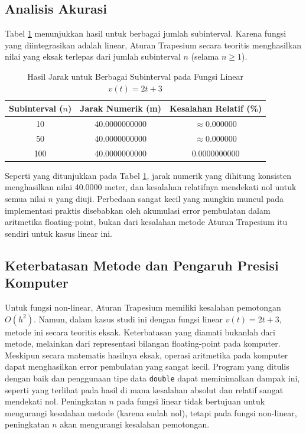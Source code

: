 \documentclass[conference]{IEEEtran}
\begin{document}
\subsection{Analisis Akurasi}
Tabel \ref{tab:results} menunjukkan hasil untuk berbagai jumlah subinterval. Karena fungsi yang diintegrasikan adalah linear, Aturan Trapesium secara teoritis menghasilkan nilai yang eksak terlepas dari jumlah subinterval \(n\) (selama \(n \ge 1\)).
\begin{table}[htbp]
\caption{Hasil Jarak untuk Berbagai Subinterval pada Fungsi Linear \(v(t)=2t+3\)}
\begin{center}
\small %
\begin{tabular}{|c|c|c|} %
\hline
\textbf{Subinterval (\( n \))} & \textbf{Jarak Numerik (m)} & \textbf{Kesalahan Relatif (\%)} \\
\hline
10 & 40.0000000000 & $\approx 0.000000$ \\ %
50 & 40.0000000000 & $\approx 0.000000$ \\ %
100 & 40.0000000000 & $0.0000000000$ \\ %
\hline
\end{tabular}
\label{tab:results}
\end{center}
\end{table}
Seperti yang ditunjukkan pada Tabel \ref{tab:results}, jarak numerik yang dihitung konsisten menghasilkan nilai 40.0000 meter, dan kesalahan relatifnya mendekati nol untuk semua nilai \( n \) yang diuji. Perbedaan sangat kecil yang mungkin muncul pada implementasi praktis disebabkan oleh akumulasi error pembulatan dalam aritmetika floating-point, bukan dari kesalahan metode Aturan Trapesium itu sendiri untuk kasus linear ini.

\subsection{Keterbatasan Metode dan Pengaruh Presisi Komputer}
Untuk fungsi non-linear, Aturan Trapesium memiliki kesalahan pemotongan \(O(h^2)\). Namun, dalam kasus studi ini dengan fungsi linear \(v(t) = 2t+3\), metode ini secara teoritis eksak. Keterbatasan yang diamati bukanlah dari metode, melainkan dari representasi bilangan floating-point pada komputer. Meskipun secara matematis hasilnya eksak, operasi aritmetika pada komputer dapat menghasilkan error pembulatan yang sangat kecil. Program yang ditulis dengan baik dan penggunaan tipe data \texttt{double} dapat meminimalkan dampak ini, seperti yang terlihat pada hasil di mana kesalahan absolut dan relatif sangat mendekati nol. Peningkatan \( n \) pada fungsi linear tidak bertujuan untuk mengurangi kesalahan metode (karena sudah nol), tetapi pada fungsi non-linear, peningkatan \( n \) akan mengurangi kesalahan pemotongan.
\end{document}
